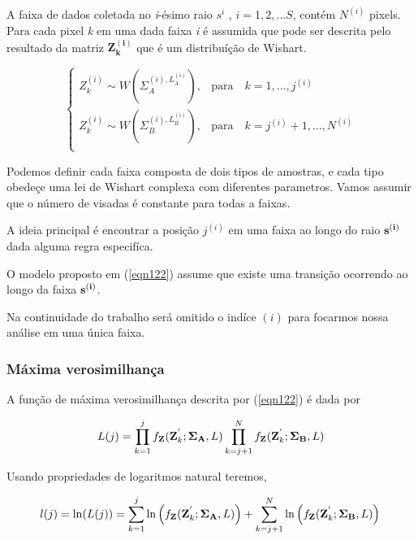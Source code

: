 \documentclass[12pt,a4paper]{article}
\begin{document}
A faixa de dados coletada no {\it i}-ésimo raio {\bf $s^{i}$} , $i=1,2,\dots S$, contém $N^{(i)}$ pixels. Para cada pixel {\it k} em uma dada faixa {\it i} é assumida que pode ser descrita pelo resultado da matriz $\mathbf{Z_{k}^{(i)}}$ que é um distribuíção de Wishart.  


\begin{equation}\label{eqn122}
 \left\{
\begin{array}{cl}
	Z_{k}^{(i)}\sim W(\Sigma_{A}^{(i),L_{A}^{(i)}}),& \mbox{para}\quad k=1,\dots,j^{(i)}  \\
	Z_{k}^{(i)}\sim W(\Sigma_{B}^{(i),L_{B}^{(i)}}),& \mbox{para}\quad k=j^{(i)} + 1,\dots,N^{(i)}  \\
\end{array}
\right.
\end{equation}

Podemos definir cada faixa composta de dois tipos de amostras, e cada tipo obedeçe uma lei de Wishart complexa com diferentes parametros. Vamos assumir que o número de visadas é constante para todas a faixas.

A ideia principal é encontrar a posição $j^{(i)}$ em uma faixa ao longo do raio ${\bf s^{(i)}}$ dada alguma regra especifíca.

O modelo proposto em (\ref{eqn122}) assume que existe uma transição ocorrendo ao longo da faixa $\bf s^{(i)}$. 

Na continuidade do trabalho será omitido o indíce $(i)$ para focarmos nossa análise em uma única faixa.

\subsubsection{Máxima verosimilhança}

A função de máxima verosimilhança descrita por (\ref{eqn122}) é dada por

\begin{equation*}
	L(j)=\prod_{k=1}^{j}f_{\mathbf{Z}}(\mathbf{Z}_{k}^{'};\mathbf{\Sigma_{A}},L) \prod_{k=j+1}^{N}f_{\mathbf{Z}}(\mathbf{Z}_{k}^{'};\mathbf{\Sigma_{B}},L) \\
\end{equation*}

Usando propriedades de logaritmos natural teremos,


\begin{equation}\label{eqn123}
	l(j)=\ln(L(j))=\sum_{k=1}^{j}\ln\left(f_{\mathbf{Z}}(\mathbf{Z}_{k}^{'};\mathbf{\Sigma_{A}},L)\right)+ \sum_{k=j+1}^{N}\ln\left(f_{\mathbf{Z}}(\mathbf{Z}_{k}^{'};\mathbf{\Sigma_{B}},L)\right) \\
\end{equation}
\end{document}
